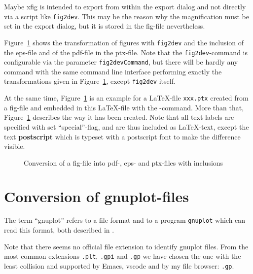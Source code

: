 Maybe xfig is intended to export from within the export dialog 
and not directly via a script like \texttt{fig2dev}. 
This may be the reason 
why the magnification must be set in the export dialog, 
but it is stored in the fig-file nevertheless. 

Figure~\ref{fig:fig2dev} shows the transformation 
of figures with \texttt{fig2dev} 
and the inclusion of the eps-file and of the pdf-file in the ptx-file. 
Note that the \texttt{fig2dev}-command is configurable 
via the parameter \texttt{fig2devCommand}, 
but there will be hardly any command with the same command line interface 
performing exactly the transformations given in Figure~\ref{fig:fig2dev}, 
except \texttt{fig2dev} itself. 

At the same time, Figure~\ref{fig:fig2dev} is an example 
for a \LaTeX-file \texttt{xxx.ptx} created from a fig-file 
and embedded in this \LaTeX-file 
with the -command. 
More than that, 
Figure~\ref{fig:fig2dev} describes the way it has been created. 
Note that all text labels are specified with set ``special''-flag, 
and are thus included as \LaTeX-text, 
except the text \textbf{\tiny postscript} 
which is typeset with a postscript font to make the difference visible. 


\begin{figure}[htb]
\centering
{}
\caption{\label{fig:fig2dev}Conversion of a fig-file 
into pdf-, eps- and ptx-files with inclusions}
\end{figure}


\section{Conversion of gnuplot-files}\label{sec:gnuplot2dev}

The term ``gnuplot'' refers to a file format
and to a program \texttt{gnuplot}
which can read this format, both described in \cite{GnuPlot}. 

Note that there seems no official file extension 
to identify gnuplot files. 
From the most common extensions \texttt{.plt}, \texttt{.gpi} and \texttt{.gp} 
we have chosen the one with the least collision 
and supported by Emacs, vscode and by my file browser: \texttt{.gp}. 

